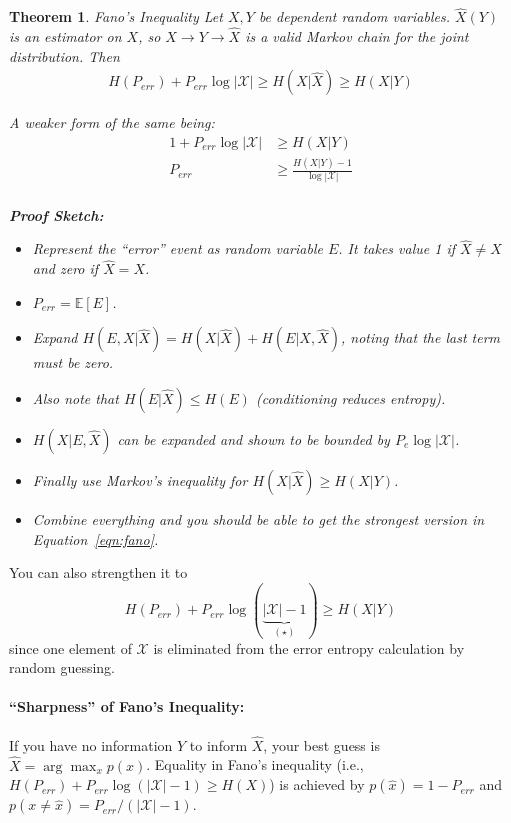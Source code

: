 \documentclass[a4paper,12pt]{report}
\newtheorem{theorem}{Theorem}
\begin{document}
\begin{theorem}{Fano's Inequality}
Let $X,Y$ be dependent random variables. $\hat X(Y)$ is an estimator on $X$, so
$X\to Y\to \hat X$ is a valid Markov chain for the joint distribution. Then 
\begin{align}
	\label{eqn:fano}
	H(P_{err}) + P_{err} \log |\mathcal X| \geq H(X | \hat X) \geq H(X | Y)
\end{align}

A weaker form of the same being: 
\begin{align}
	\label{eqn:fano_weak}
	1 + P_{err} \log |\mathcal X| &\geq H(X | Y) \\
	P_{err} &\geq \frac{H(X| Y)-1}{\log |\mathcal X|} \\
\end{align}

\textbf{Proof Sketch:} 
\begin{itemize}
\item Represent the ``error'' event as random variable $E$. It takes value 1 if
$\hat X \neq X$ and zero if $\hat X = X$.
\item $P_{err} = \mathbb E[E]$.
\item Expand $H(E, X | \hat X) = H(X | \hat X) + H(E | X, \hat X)$, noting that
the last term must be zero.
\item Also note that $H(E | \hat X) \leq H(E)$ (conditioning reduces entropy).
\item $H(X | E, \hat X)$ can be expanded and shown to be bounded by $P_e \log
|\mathcal X|$.
\item Finally use Markov's inequality for $H(X | \hat X) \geq H(X | Y)$. 
\item Combine everything and you should be able to get the strongest version in
Equation~\ref{eqn:fano}.
\end{itemize}
\end{theorem}

You can also strengthen it to $$H(P_{err}) + P_{err} \log (\underbrace{|\mathcal
X| - 1}_{(\star)}) \geq H(X|Y)$$ since one element of $\mathcal X$ is eliminated
from the error entropy calculation by random guessing.


\paragraph{``Sharpness'' of Fano's Inequality: } If you have no information $Y$
to inform $\hat X$, your best guess is $\hat X = \arg\max_x p(x)$. Equality in
Fano's inequality (i.e., $H(P_{err}) + P_{err} \log(|\mathcal X| - 1) \geq
H(X)$) is achieved by $p(\hat x) = 1-P_{err}$ and $p(x \neq \hat x) =
P_{err}/(|\mathcal X|-1)$.
\end{document}
